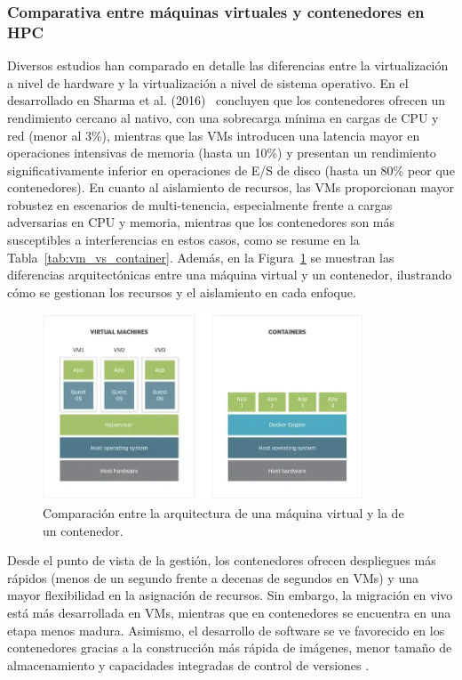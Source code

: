 \subsubsection{Comparativa entre máquinas virtuales y contenedores en HPC}

Diversos estudios han comparado en detalle las diferencias entre la virtualización a nivel de hardware y la virtualización a nivel de sistema operativo. En el desarrollado en Sharma et al. (2016)~\cite{sharma2016containers} concluyen que los contenedores ofrecen un rendimiento cercano al nativo, con una sobrecarga mínima en cargas de CPU y red (menor al 3\%), mientras que las VMs introducen una latencia mayor en operaciones intensivas de memoria (hasta un 10\%) y presentan un rendimiento significativamente inferior en operaciones de E/S de disco (hasta un 80\% peor que contenedores). En cuanto al aislamiento de recursos, las VMs proporcionan mayor robustez en escenarios de multi-tenencia, especialmente frente a cargas adversarias en CPU y memoria, mientras que los contenedores son más susceptibles a interferencias en estos casos, como se resume en la Tabla~\ref{tab:vm_vs_container}. Además, en la Figura~\ref{fig:vm_vs_container} se muestran las diferencias arquitectónicas entre una máquina virtual y un contenedor, ilustrando cómo se gestionan los recursos y el aislamiento en cada enfoque.

\begin{figure}[ht]
    \centering
    \includegraphics[width=0.85\textwidth]{imagenes/cap3/maquina-virtual-vs-contenedor.png}
    \caption[Comparación entre la arquitectura de una máquina virtual y la de un contenedor.]{Comparación entre la arquitectura de una máquina virtual y la de un contenedor. \cite{electronicaonline_vm}}
    \label{fig:vm_vs_container}
\end{figure}

Desde el punto de vista de la gestión, los contenedores ofrecen despliegues más rápidos (menos de un segundo frente a decenas de segundos en VMs) y una mayor flexibilidad en la asignación de recursos. Sin embargo, la migración en vivo está más desarrollada en VMs, mientras que en contenedores se encuentra en una etapa menos madura. Asimismo, el desarrollo de software se ve favorecido en los contenedores gracias a la construcción más rápida de imágenes, menor tamaño de almacenamiento y capacidades integradas de control de versiones \cite{sharma2016containers}.

